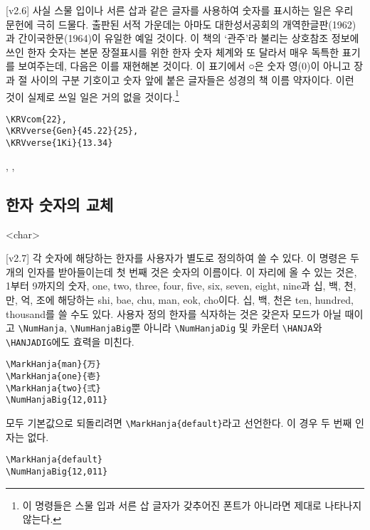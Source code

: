\documentclass[b5paper,nanum]{oblivoir}
\def\cs#1{\texttt{\textbackslash #1}}
\begin{document}
\bigskip

[v2.6] 사실 스물 입이나 서른 삽과 같은 글자를 사용하여 숫자를 표시하는 일은 우리 문헌에 극히 드물다.
출판된 서적 가운데는 아마도 대한성서공회의  개역한글판(1962)과 간이국한문(1964)이 유일한 예일 것이다.
이 책의 `관주'라 불리는 상호참조 정보에 쓰인 한자 숫자는 본문 장절표시를 위한 한자 숫자 체계와 또 달라서 매우 독특한 
표기를 보여주는데, 다음은 이를 재현해본 것이다. 이 표기에서 ○은 숫자 영($0$)이 아니고 장과 절 사이의 구분 기호이고 숫자 앞에 붙은 글자들은 성경의 책 이름 약자이다. 이런 것이 실제로 쓰일 일은 거의 없을 것이다.\footnote{%
	이 명령들은 스물 입과 서른 삽 글자가 갖추어진 폰트가 아니라면 제대로 나타나지 않는다.}
\begin{verbatim}
\KRVcom{22},
\KRVverse{Gen}{45.22}{25},
\KRVverse{1Ki}{13.34}
\end{verbatim}
,
,

\subsection{한자 숫자의 교체}
\begin{boxedverbatim}
 { <char> }
\end{boxedverbatim}
[v2.7] 각 숫자에 해당하는 한자를 사용자가 별도로 정의하여 쓸 수 있다.
이 명령은 두 개의 인자를 받아들이는데 첫 번째 것은 숫자의 이름이다. 이 자리에 올 수 있는 것은,
1부터 9까지의 숫자, one, two, three, four, five, six, seven, eight, nine과
십, 백, 천, 만, 억, 조에 해당하는 shi, bae, chu, man, eok, cho이다. 십, 백, 천은 ten, hundred, thousand를
쓸 수도 있다. 사용자 정의 한자를 식자하는 것은 갖은자 모드가 아닐 때이고 \cs{NumHanja}, \cs{NumHanjaBig}뿐 아니라 \cs{NumHanjaDig} 및 카운터 \cs{HANJA}와 \cs{HANJADIG}에도 효력을 미친다.
\begin{verbatim}
\MarkHanja{man}{万}
\MarkHanja{one}{壱}
\MarkHanja{two}{弍}
\NumHanjaBig{12,011}
\end{verbatim}

\medskip

모두 기본값으로 되돌리려면 \cs{MarkHanja\{default\}}라고 선언한다. 이 경우 두 번째 인자는 없다.

\begin{verbatim}
\MarkHanja{default}
\NumHanjaBig{12,011}
\end{verbatim}

\medskip
\end{document}
